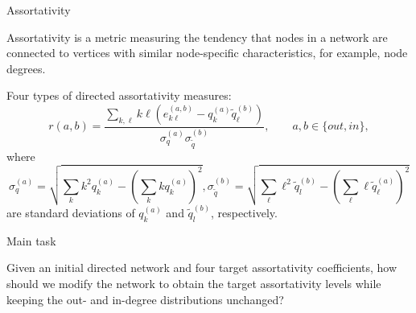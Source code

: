 \documentclass[xcolor=dvipsnames, compress, 10pt]{beamer}
\theoremstyle{remark}
\newcommand{\tq}{\tilde{q}}
\begin{document}
\begin{frame}{Assortativity}

Assortativity is a metric measuring the tendency that nodes in a network are
connected to vertices with similar node-specific characteristics, for example,
node degrees.

\vspace{0.1cm}

Four types of directed assortativity measures:
\begin{equation*}
  	r(a, b) = 
    \frac{\sum_{k,\ell} k\ell \left(e^{(a,b)}_{k\ell} - q_k^{(a)} 
    \tq_\ell^{(b)}\right)}{\sigma_q^{(a)} \sigma_{\tq}^{(b)}},
    \qquad a,b \in \{out,in\},
\end{equation*} 
where 
\[
\sigma_q^{(a)} = 
\sqrt{\sum_k k^2 q_k^{(a)} - \left(\sum_k k q_k^{(a)}\right)^2}, 
\sigma_{\tq}^{(b)} = 
\sqrt{\sum_\ell \ell^2 \tq_l^{(b)} - 
	\left(\sum_\ell \ell \tq_\ell^{(a)}\right)^2}
\]
are standard deviations of $q_k^{(a)}$ and $\tq_l^{(b)}$, 
respectively.





\end{frame}



\begin{frame}{Main task}


Given an initial directed network and four target assortativity coefficients,
how should we modify the network to obtain the 
target assortativity levels while keeping the out- and in-degree distributions
unchanged?
	
	
\end{frame}
\end{document}
